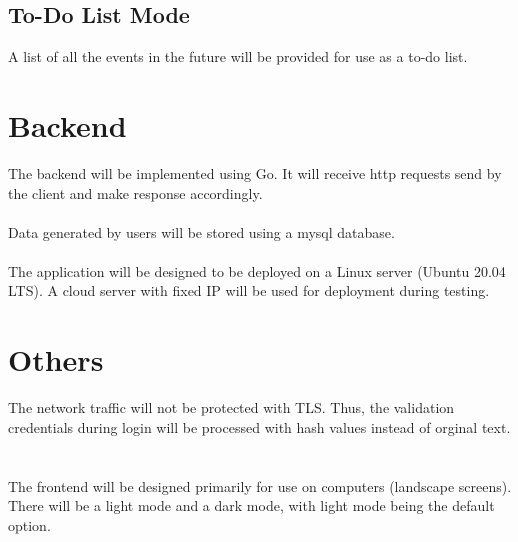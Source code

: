 \documentclass{article}[12pt]
\begin{document}
\subsection{To-Do List Mode}
A list of all the events in the future will be provided for use as a to-do list.
~\\



\section{Backend}
The backend will be implemented using Go.
It will receive http requests send by the client and make response accordingly.
~\\~\\
Data generated by users will be stored using a mysql database.
~\\~\\
The application will be designed to be deployed on a Linux server (Ubuntu 20.04 LTS).
A cloud server with fixed IP will be used for deployment during testing.



\section{Others}
The network traffic will not be protected with TLS.
Thus, the validation credentials during login will be processed with hash values instead of orginal text.
~\\~\\
The frontend will be designed primarily for use on computers (landscape screens).
There will be a light mode and a dark mode, with light mode being the default option.
\end{document}
